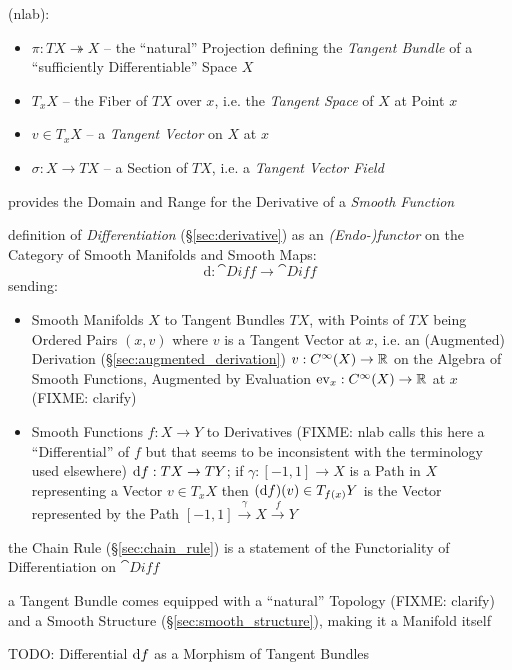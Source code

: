 (nlab):

\begin{itemize}
  \item $\pi : T X \twoheadrightarrow X$ -- the ``natural'' Projection defining
    the \emph{Tangent Bundle} of a ``sufficiently Differentiable'' Space $X$
  \item $T_x X$ -- the Fiber of $T X$ over $x$, i.e. the \emph{Tangent Space} of
    $X$ at Point $x$
  \item $v \in T_x X$ -- a \emph{Tangent Vector} on $X$ at $x$
  \item $\sigma : X \rightarrow T X$ -- a Section of $T X$, i.e. a
    \emph{Tangent Vector Field}
\end{itemize}

provides the Domain and Range for the Derivative of a \emph{Smooth Function}

definition of \emph{Differentiation} (\S\ref{sec:derivative}) as an
\emph{(Endo-)functor} on the Category of Smooth Manifolds and Smooth Maps:
\[
  \mathrm{d} : \cat{Diff} \rightarrow \cat{Diff}
\]
sending:
\begin{itemize}
  \item Smooth Manifolds $X$ to Tangent Bundles $T X$, with Points of $T X$
    being Ordered Pairs $(x, v)$ where $v$ is a Tangent Vector at $x$, i.e. an
    (Augmented) Derivation (\S\ref{sec:augmented_derivation}) $v : C^\infty(X)
    \rightarrow \mathbb{R}$ on the Algebra of Smooth Functions, Augmented by
    Evaluation $\mathrm{ev}_x : C^\infty(X) \rightarrow \mathbb{R}$ at $x$
    (FIXME: clarify)
  \item Smooth Functions $f : X \rightarrow Y$ to Derivatives (FIXME: nlab calls
    this here a ``Differential'' of $f$ but that seems to be inconsistent with
    the terminology used elsewhere) $\mathrm{d}f : TX \rightarrow TY$; if $\gamma
    : [-1,1] \rightarrow X$ is a Path in $X$ representing a Vector
    $v \in T_x{X}$ then $(\mathrm{d}f)(v) \in T_{f(x)}Y$ is the Vector represented
    by the Path $[-1, 1] \xrightarrow{\gamma} X \xrightarrow{f} Y$
\end{itemize}

the Chain Rule (\S\ref{sec:chain_rule}) is a statement of the Functoriality of
Differentiation on $\cat{Diff}$

a Tangent Bundle comes equipped with a ``natural'' Topology (FIXME: clarify)
and a Smooth Structure (\S\ref{sec:smooth_structure}), making it a Manifold
itself

TODO: Differential $\mathrm{d}f$ as a Morphism of Tangent Bundles

